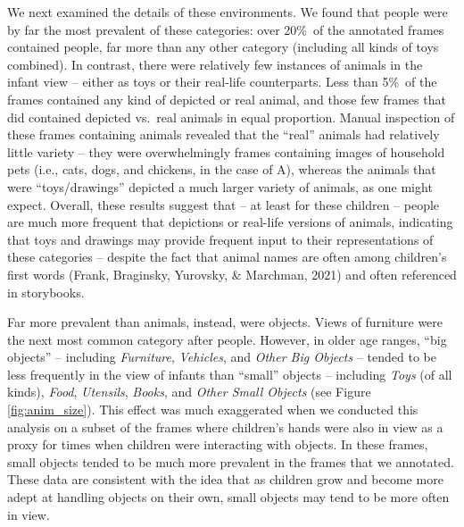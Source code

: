 \documentclass[10pt, letterpaper]{article}
\begin{document}
We next examined the details of these environments. We found that people
were by far the most prevalent of these categories: over 20\%~of the
annotated frames contained people, far more than any other category
(including all kinds of toys combined). In contrast, there were
relatively few instances of animals in the infant view -- either as toys
or their real-life counterparts. Less than 5\%~of the frames contained
any kind of depicted or real animal, and those few frames that did
contained depicted vs.~real animals in equal proportion. Manual
inspection of these frames containing animals revealed that the ``real''
animals had relatively little variety -- they were overwhelmingly frames
containing images of household pets (i.e., cats, dogs, and chickens, in
the case of A), whereas the animals that were ``toys/drawings'' depicted
a much larger variety of animals, as one might expect. Overall, these
results suggest that -- at least for these children -- people are much
more frequent that depictions or real-life versions of animals,
indicating that toys and drawings may provide frequent input to their
representations of these categories -- despite the fact that animal
names are often among children's first words (Frank, Braginsky,
Yurovsky, \& Marchman, 2021) and often referenced in storybooks.

Far more prevalent than animals, instead, were objects. Views of
furniture were the next most common category after people. However, in
older age ranges, ``big objects'' -- including \emph{Furniture},
\emph{Vehicles}, and \emph{Other Big Objects} -- tended to be less
frequently in the view of infants than ``small'' objects -- including
\emph{Toys} (of all kinds), \emph{Food}, \emph{Utensils}, \emph{Books},
and \emph{Other Small Objects} (see Figure \ref{fig:anim_size}). This
effect was much exaggerated when we conducted this analysis on a subset
of the frames where children's hands were also in view as a proxy for
times when children were interacting with objects. In these frames,
small objects tended to be much more prevalent in the frames that we
annotated. These data are consistent with the idea that as children grow
and become more adept at handling objects on their own, small objects
may tend to be more often in view.
\end{document}
